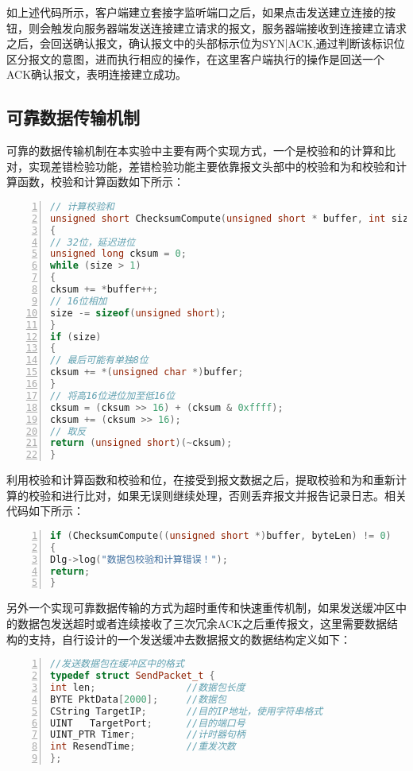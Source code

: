 \documentclass[lang=cn,11pt]{elegantpaper}
\begin{document}
如上述代码所示，客户端建立套接字监听端口之后，如果点击发送建立连接的按钮，则会触发向服务器端发送连接建立请求的报文，服务器端接收到连接建立请求之后，会回送确认报文，确认报文中的头部标示位为SYN|ACK,通过判断该标识位区分报文的意图，进而执行相应的操作，在这里客户端执行的操作是回送一个ACK确认报文，表明连接建立成功。

\subsection{可靠数据传输机制}

可靠的数据传输机制在本实验中主要有两个实现方式，一个是校验和的计算和比对，实现差错检验功能，差错检验功能主要依靠报文头部中的校验和为和校验和计算函数，校验和计算函数如下所示：

\begin{lstlisting}[language = C++, numbers=left, 
numberstyle=\tiny,keywordstyle=\color{blue!70},
commentstyle=\color{red!50!green!50!blue!50},frame=shadowbox,
rulesepcolor=\color{red!20!green!20!blue!20},basicstyle=\ttfamily]
// 计算校验和
unsigned short ChecksumCompute(unsigned short * buffer, int size)
{
// 32位，延迟进位
unsigned long cksum = 0;
while (size > 1)
{
cksum += *buffer++;
// 16位相加
size -= sizeof(unsigned short);
}
if (size)
{
// 最后可能有单独8位
cksum += *(unsigned char *)buffer;
}
// 将高16位进位加至低16位
cksum = (cksum >> 16) + (cksum & 0xffff);
cksum += (cksum >> 16);
// 取反
return (unsigned short)(~cksum);
}
\end{lstlisting}

利用校验和计算函数和校验和位，在接受到报文数据之后，提取校验和为和重新计算的校验和进行比对，如果无误则继续处理，否则丢弃报文并报告记录日志。相关代码如下所示：

\begin{lstlisting}[language = C++, numbers=left, 
numberstyle=\tiny,keywordstyle=\color{blue!70},
commentstyle=\color{red!50!green!50!blue!50},frame=shadowbox,
rulesepcolor=\color{red!20!green!20!blue!20},basicstyle=\ttfamily]
if (ChecksumCompute((unsigned short *)buffer, byteLen) != 0)			//差错检验
{
Dlg->log("数据包校验和计算错误！");
return;
}
\end{lstlisting}

另外一个实现可靠数据传输的方式为超时重传和快速重传机制，如果发送缓冲区中的数据包发送超时或者连续接收了三次冗余ACK之后重传报文，这里需要数据结构的支持，自行设计的一个发送缓冲去数据报文的数据结构定义如下：

\begin{lstlisting}[language = C++, numbers=left, 
numberstyle=\tiny,keywordstyle=\color{blue!70},
commentstyle=\color{red!50!green!50!blue!50},frame=shadowbox,
rulesepcolor=\color{red!20!green!20!blue!20},basicstyle=\ttfamily]
//发送数据包在缓冲区中的格式
typedef struct SendPacket_t {
int len;				//数据包长度
BYTE PktData[2000];		//数据包
CString TargetIP;		//目的IP地址，使用字符串格式
UINT   TargetPort;		//目的端口号
UINT_PTR Timer;			//计时器句柄
int ResendTime;			//重发次数
};
\end{lstlisting}
\end{document}
